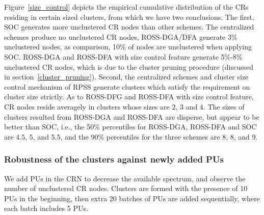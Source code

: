 \documentclass[10pt,journal,compsoc]{IEEEtran}
\theoremstyle{mytheoremstyle}
\theoremstyle{mytheoremstyle}
\theoremstyle{mytheoremstyle}
\newcommand{\ie}{i.e., }
\begin{document}
Figure~\ref{size_control} depicts the empirical cumulative distribution of the CRs residing in certain sized clusters, from which we have two conclusions.
The first, SOC generates more unclustered CR nodes than other schemes.
The centralized schemes produce no unclustered CR nodes, ROSS-DGA/DFA generate 3\% unclustered nodes, as comparison, 10\% of nodes are unclustered when applying SOC.
ROSS-DGA and ROSS-DFA with size control feature generate 5\%-8\% unclustered CR nodes, which is due to the cluster pruning procedure (discussed in section~\ref{cluster_pruning}).
Second, the centralized schemes and cluster size control mechanism of RPSS generate clusters which satisfy the requirement on cluster size strictly.
As to ROSS-DFG and ROSS-DFA with size control feature, CR nodes reside averagely in clusters whose sizes are 2, 3 and 4.
The sizes of clusters resulted from ROSS-DGA and ROSS-DFA are disperse, but appear to be better than SOC, i.e., the 50\% percentiles for ROSS-DGA, ROSS-DFA and SOC are 4.5, 5, and 5.5, and the 90\% percentiles for the three schemes are 8, 8, and 9.



\subsubsection{Robustness of the clusters against newly added PUs}
We add PUs in the CRN to decrease the available spectrum, and observe the number of unclustered CR nodes.
Clusters are formed with the presence of 10 PUs in the beginning, then extra 20 batches of PUs are added sequentially, where each batch includes 5 PUs. 
\end{document}
